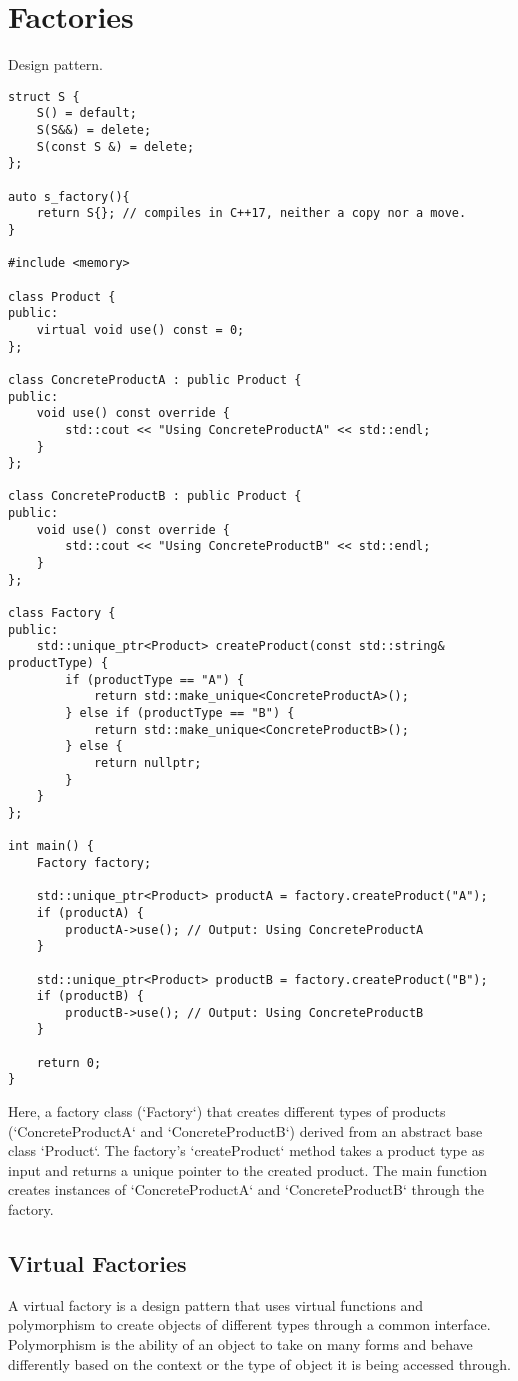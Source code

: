 \documentclass[openany]{report}
\begin{document}
\section{Factories}

Design pattern.

\begin{verbatim}
struct S {
    S() = default;
    S(S&&) = delete;
    S(const S &) = delete;
};

auto s_factory(){
    return S{}; // compiles in C++17, neither a copy nor a move.
}

#include <memory>

class Product {
public:
    virtual void use() const = 0;
};

class ConcreteProductA : public Product {
public:
    void use() const override {
        std::cout << "Using ConcreteProductA" << std::endl;
    }
};

class ConcreteProductB : public Product {
public:
    void use() const override {
        std::cout << "Using ConcreteProductB" << std::endl;
    }
};

class Factory {
public:
    std::unique_ptr<Product> createProduct(const std::string& productType) {
        if (productType == "A") {
            return std::make_unique<ConcreteProductA>();
        } else if (productType == "B") {
            return std::make_unique<ConcreteProductB>();
        } else {
            return nullptr;
        }
    }
};

int main() {
    Factory factory;
    
    std::unique_ptr<Product> productA = factory.createProduct("A");
    if (productA) {
        productA->use(); // Output: Using ConcreteProductA
    }
    
    std::unique_ptr<Product> productB = factory.createProduct("B");
    if (productB) {
        productB->use(); // Output: Using ConcreteProductB
    }
    
    return 0;
}

\end{verbatim}

Here, a factory class (`Factory`) that creates different types of products
(`ConcreteProductA` and `ConcreteProductB`) derived from an abstract base class `Product`.
The factory's `createProduct` method takes a product type as input and returns a unique pointer to the created product.
The main function creates instances of `ConcreteProductA` and `ConcreteProductB` through the factory.

\subsection{Virtual Factories}
A virtual factory is a design pattern that uses virtual functions and 
polymorphism to create objects of different types through a common interface.
Polymorphism is the ability of an object to take on many forms
and behave differently based on the context or the type of object it is being accessed through.
\end{document}
